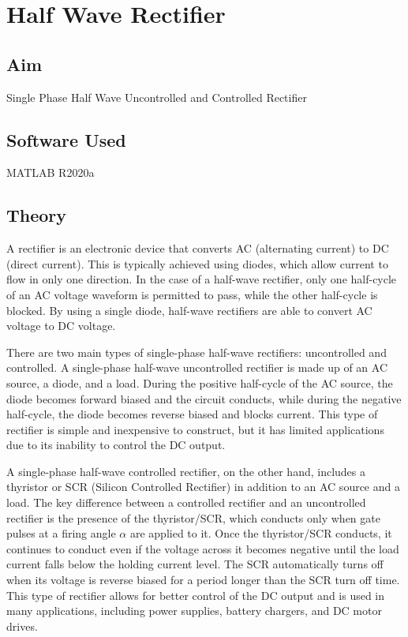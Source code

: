 \chapter{Half Wave Rectifier}
\vspace{-1cm}

\section{Aim}
\hspace{1cm}Single Phase Half Wave Uncontrolled and Controlled Rectifier

\section{Software Used}
\hspace{1cm}MATLAB R2020a
\section{Theory}
\hspace{\parindent}

A rectifier is an electronic device that converts AC (alternating current) to DC (direct current). This is typically achieved using diodes, which allow current to flow in only one direction. In the case of a half-wave rectifier, only one half-cycle of an AC voltage waveform is permitted to pass, while the other half-cycle is blocked. By using a single diode, half-wave rectifiers are able to convert AC voltage to DC voltage.

There are two main types of single-phase half-wave rectifiers: uncontrolled and controlled. A single-phase half-wave uncontrolled rectifier is made up of an AC source, a diode, and a load. During the positive half-cycle of the AC source, the diode becomes forward biased and the circuit conducts, while during the negative half-cycle, the diode becomes reverse biased and blocks current. This type of rectifier is simple and inexpensive to construct, but it has limited applications due to its inability to control the DC output.

A single-phase half-wave controlled rectifier, on the other hand, includes a thyristor or SCR (Silicon Controlled Rectifier) in addition to an AC source and a load. The key difference between a controlled rectifier and an uncontrolled rectifier is the presence of the thyristor/SCR, which conducts only when gate pulses at a firing angle $ \alpha $ are applied to it. Once the thyristor/SCR conducts, it continues to conduct even if the voltage across it becomes negative until the load current falls below the holding current level. The SCR automatically turns off when its voltage is reverse biased for a period longer than the SCR turn off time. This type of rectifier allows for better control of the DC output and is used in many applications, including power supplies, battery chargers, and DC motor drives.


